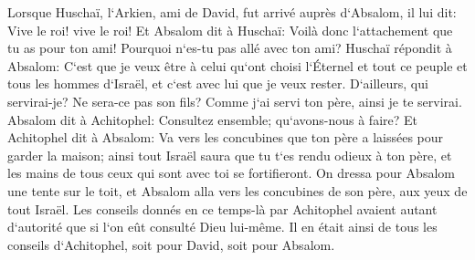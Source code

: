 \verse Lorsque Huschaï, l`Arkien, ami de David, fut arrivé auprès d`Absalom, il lui dit: Vive le roi! vive le roi! 
\verse Et Absalom dit à Huschaï: Voilà donc l`attachement que tu as pour ton ami! Pourquoi n`es-tu pas allé avec ton ami? 
\verse Huschaï répondit à Absalom: C`est que je veux être à celui qu`ont choisi l`Éternel et tout ce peuple et tous les hommes d`Israël, et c`est avec lui que je veux rester. 
\verse D`ailleurs, qui servirai-je? Ne sera-ce pas son fils? Comme j`ai servi ton père, ainsi je te servirai. 
\verse Absalom dit à Achitophel: Consultez ensemble; qu`avons-nous à faire? 
\verse Et Achitophel dit à Absalom: Va vers les concubines que ton père a laissées pour garder la maison; ainsi tout Israël saura que tu t`es rendu odieux à ton père, et les mains de tous ceux qui sont avec toi se fortifieront. 
\verse On dressa pour Absalom une tente sur le toit, et Absalom alla vers les concubines de son père, aux yeux de tout Israël. 
\verse Les conseils donnés en ce temps-là par Achitophel avaient autant d`autorité que si l`on eût consulté Dieu lui-même. Il en était ainsi de tous les conseils d`Achitophel, soit pour David, soit pour Absalom. 

\chapter{}

